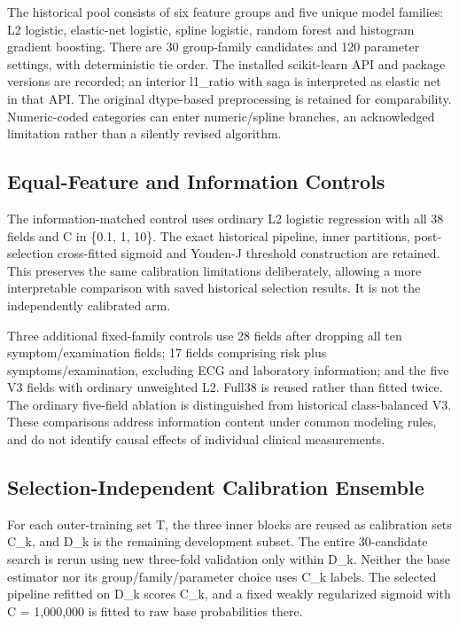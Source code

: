 \documentclass[conference]{IEEEtran}
\begin{document}
The historical pool consists of six feature groups and five unique model families: L2 logistic, elastic-net logistic, spline logistic, random forest and histogram gradient boosting. There are 30 group-family candidates and 120 parameter settings, with deterministic tie order. The installed scikit-learn API and package versions are recorded; an interior l1\_ratio with saga is interpreted as elastic net in that API. The original dtype-based preprocessing is retained for comparability. Numeric-coded categories can enter numeric/spline branches, an acknowledged limitation rather than a silently revised algorithm.

\subsection{Equal-Feature and Information Controls}
The information-matched control uses ordinary L2 logistic regression with all 38 fields and C in \{0.1, 1, 10\}. The exact historical pipeline, inner partitions, post-selection cross-fitted sigmoid and Youden-J threshold construction are retained. This preserves the same calibration limitations deliberately, allowing a more interpretable comparison with saved historical selection results. It is not the independently calibrated arm.

Three additional fixed-family controls use 28 fields after dropping all ten symptom/examination fields; 17 fields comprising risk plus symptoms/examination, excluding ECG and laboratory information; and the five V3 fields with ordinary unweighted L2. Full38 is reused rather than fitted twice. The ordinary five-field ablation is distinguished from historical class-balanced V3. These comparisons address information content under common modeling rules, and do not identify causal effects of individual clinical measurements.

\subsection{Selection-Independent Calibration Ensemble}
For each outer-training set T, the three inner blocks are reused as calibration sets C\_k, and D\_k is the remaining development subset. The entire 30-candidate search is rerun using new three-fold validation only within D\_k. Neither the base estimator nor its group/family/parameter choice uses C\_k labels. The selected pipeline refitted on D\_k scores C\_k, and a fixed weakly regularized sigmoid with C = 1,000,000 is fitted to raw base probabilities there.
\end{document}
